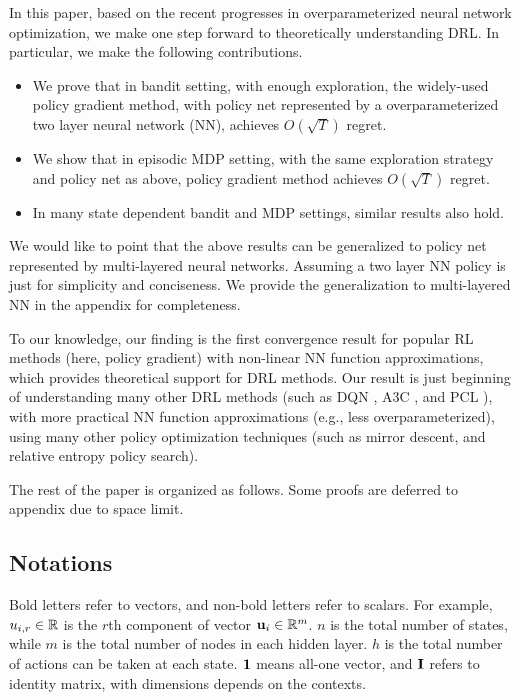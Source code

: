 In this paper, based on the recent progresses in overparameterized neural network optimization, we make one step forward to theoretically understanding DRL. In particular, we make the following contributions.
\begin{itemize}
    \item We prove that in bandit setting, with enough exploration, the widely-used policy gradient method, with policy net represented by a overparameterized two layer neural network (NN), achieves $O\left( \sqrt{T} \right)$ regret.
    \item We show that in episodic MDP setting, with the same exploration strategy and policy net as above, policy gradient method achieves $O\left( \sqrt{T} \right)$ regret.
    \item In many state dependent bandit and MDP settings, similar results also hold.
\end{itemize}

We would like to point that the above results can be generalized to policy net represented by multi-layered neural networks. Assuming a two layer NN policy is just for simplicity and conciseness. We provide the generalization to multi-layered NN in the appendix for completeness.

To our knowledge, our finding is the first convergence result for popular RL methods (here, policy gradient) with non-linear NN function approximations, which provides theoretical support for DRL methods. Our result is just beginning of understanding many other DRL methods (such as DQN \cite{mnih2015human}, A3C \citep{mnih2016asynchronous}, and PCL \citep{nachum2017bridging}), with more practical NN function approximations (e.g., less overparameterized), using many other policy optimization techniques (such as mirror descent, and relative entropy policy search).

The rest of the paper is organized as follows. Some proofs are deferred to appendix due to space limit.

\subsection{Notations}

Bold letters refer to vectors, and non-bold letters refer to scalars. For example, $u_{i,r} \in {\mathbb{R}}$ is the $r$th component of vector ${\mathbf{u}}_i \in {\mathbb{R}}^m$. $n$ is the total number of states, while $m$ is the total number of nodes in each hidden layer. $h$ is the total number of actions can be taken at each state. ${\mathbf{1}}$ means all-one vector, and ${\mathbf{I}}$ refers to identity matrix, with dimensions depends on the contexts.

